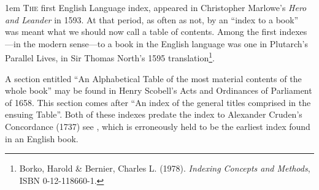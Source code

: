    \begin{rightcolumn}
      \begin{multicols}{2}
        
\parindent1em      \lettrine{T}{he} first English Language index, appeared in Christopher Marlowe's \textit{Hero and Leander} in 1593. At that period, as often as not, by an ``index to a book'' was meant what we should now call a table of contents. Among the first indexes---in the modern sense---to a book in the English language was one in Plutarch's Parallel Lives, in Sir Thomas North's 1595 translation\footnote{Borko, Harold \& Bernier, Charles L. (1978). \textit{Indexing Concepts and Methods}, ISBN 0-12-118660-1.}.  

A section entitled ``An Alphabetical Table of the most material contents of the whole book'' may be found in Henry Scobell's Acts and Ordinances of Parliament of 1658. This section comes after ``An index of the general titles comprised in the ensuing Table''. Both of these indexes predate the index to Alexander Cruden's Concordance (1737) see \citep{farrow96}, which is erroneously held to be the earliest index found in an English book.

      \end{multicols}
   \end{rightcolumn}
\stoptemplate

\pagestyle{headings}


